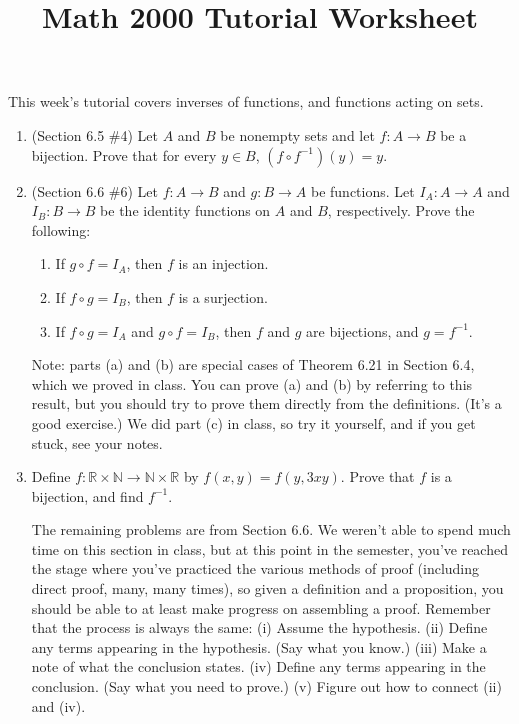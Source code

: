 \documentclass[letterpaper,12pt]{article}
\title{Math 2000 Tutorial Worksheet}
\begin{document}
\maketitle

 This week's tutorial covers inverses of functions, and functions acting on sets.
\begin{enumerate}
 \item (Section 6.5 \#4) Let $A$ and $B$ be nonempty sets and let $f:A\to B$ be a bijection. Prove that for every $y\in B$, $(f\circ f^{-1})(y) = y$.
 \item (Section 6.6 \#6) Let $f:A\to B$ and $g:B\to A$ be functions. Let $I_A:A\to A$ and $I_B:B\to B$ be the identity functions on $A$ and $B$, respectively. Prove the following:
\begin{enumerate}
 \item If $g\circ f = I_A$, then $f$ is an injection.
 \item If $f\circ g = I_B$, then $f$ is a surjection.
 \item If $f\circ g = I_A$ and $g\circ f = I_B$, then $f$ and $g$ are bijections, and $g=f^{-1}$.
\end{enumerate}
Note: parts (a) and (b) are special cases of Theorem 6.21 in Section 6.4, which we proved in class. You can prove (a) and (b) by referring to this result, but you should try to prove them directly from the definitions. (It's a good exercise.) We did part (c) in class, so try it yourself, and if you get stuck, see your notes.

 \item Define $f:\mathbb{R}\times\mathbb{N}\to\mathbb{N}\times\mathbb{R}$ by $f(x,y) = f(y,3xy)$. Prove that $f$ is a bijection, and find $f^{-1}$.

The remaining problems are from Section 6.6. We weren't able to spend much time on this section in class, but at this point in the semester, you've reached the stage where you've practiced the various methods of proof (including direct proof, many, many times), so given a definition and a proposition, you should be able to at least make progress on assembling a proof. Remember that the process is always the same: (i) Assume the hypothesis. (ii) Define any terms appearing in the hypothesis. (Say what you know.) (iii) Make a note of what the conclusion states. (iv) Define any terms appearing in the conclusion. (Say what you need to prove.) (v) Figure out how to connect (ii) and (iv).


\end{enumerate}
\end{document}
